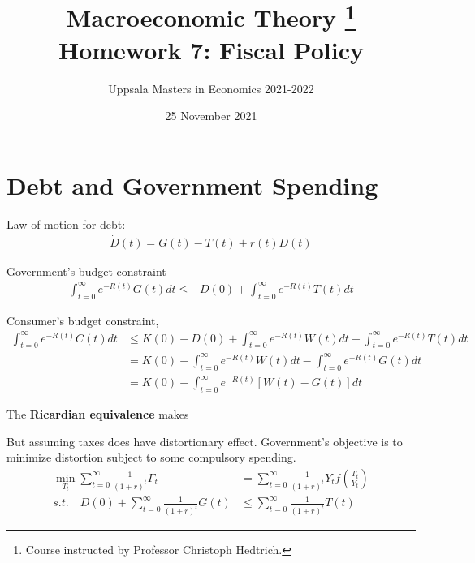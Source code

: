 \documentclass{article}
\title{ Macroeconomic Theory
        \thanks{Course instructed by Professor Christoph Hedtrich.} \\
        Homework 7: Fiscal Policy
        }
\author{
        Uppsala Masters in Economics 2021-2022
        }
\date{25 November 2021}
\newcommand{\?}{\textcolor{red}{(?)}} %
\begin{document}
    
    \maketitle
    
    \section{Debt and Government Spending}
        
        Law of motion for debt:
        \begin{align}
            \dot D(t) = G(t) - T(t) + r(t) D(t)
        \end{align}
        
        Government's budget constraint
        \begin{align}
            \int_{t=0}^\infty e^{-R(t)} G(t) dt 
            \le
            - D(0) + \int_{t=0}^\infty e^{-R(t)} T(t) dt
            \label{eqn:gov-budget}
        \end{align}
        
        
        Consumer's budget constraint,
        \begin{align}
            \int_{t=0}^\infty e^{-R(t)} C(t) dt 
            & \le
            K(0) + D(0) + 
            \int_{t=0}^\infty e^{-R(t)} W(t) dt
            -
            \int_{t=0}^\infty e^{-R(t)}  T(t) dt
            \\
            &=
            K(0) + 
            \int_{t=0}^\infty e^{-R(t)} W(t) dt
            -
            \int_{t=0}^\infty e^{-R(t)} G(t) dt
            \\
            &=
            K(0) + 
            \int_{t=0}^\infty e^{-R(t)} [W(t) - G(t)] dt
        \end{align}
        
        The \textbf{Ricardian equivalence} makes
        
        But assuming taxes does have distortionary effect. Government's objective is to minimize distortion subject to some compulsory spending.
        \begin{align}
            \min_{T_t}
            \sum_{t=0}^\infty
            \frac{1}{(1+r)^t} \Gamma_t
            &=
            \sum_{t=0}^\infty
            \frac{1}{(1+r)^t}
            Y_t f\left(\frac{T_t}{Y_t}\right)
            \\
            s.t.
            \quad
            D(0) + \sum_{t=0}^\infty \frac{1}{(1+r)^t} G(t)
            &\le
            \sum_{t=0}^\infty \frac{1}{(1+r)^t} T(t)
        \end{align}
        
\end{document}
